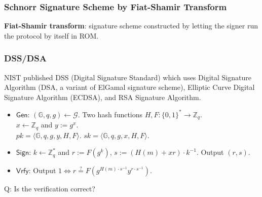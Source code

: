 \begin{frame}\frametitle{Schnorr Signature Scheme by Fiat-Shamir Transform}
\textbf{Fiat-Shamir transform}: signature scheme constructed by letting the signer run the protocol by itself in ROM.

\begin{figure}
	\begin{center}
	
	\end{center}
	\end{figure}


\end{frame}

\begin{frame}\frametitle{DSS/DSA}
NIST published DSS (Digital Signature Standard) which uses Digital Signature Algorithm (DSA, a variant of ElGamal signature scheme), Elliptic Curve Digital Signature Algorithm (ECDSA), and RSA Signature Algorithm.
\begin{construction}
\begin{itemize}
\item $\mathsf{Gen}$: $(\mathbb{G},q,g) \gets \mathcal{G}$. Two hash functions $H, F : \{0,1\}^* \to \mathbb{Z}_q$. \\
$x \gets \mathbb{Z}_q$ and $y:= g^x $.\\
$pk = \langle \mathbb{G},q,g,y,H,F\rangle$. $sk=\langle \mathbb{G},q,g,x,H,F\rangle$.
\item $\mathsf{Sign}$: $k\gets \mathbb{Z}^*_q$ and $r:= F(g^k) $, $s:= (H(m)+xr)\cdot k^{-1}$. Output $(r,s)$.
\item $\mathsf{Vrfy}$: Output $1 \iff r \overset{?}{=} F(g^{H(m)\cdot s^{-1}}y^{r\cdot s^{-1}}).$
\end{itemize}
\end{construction}
\alert{Q: Is the verification correct?}
\end{frame}



